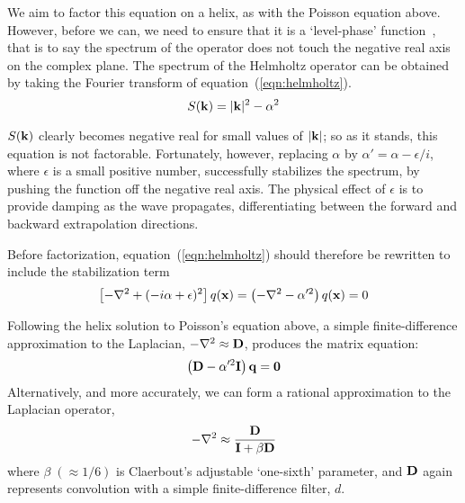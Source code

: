 \par
We aim to factor this equation on a helix, as with the Poisson
equation above.  However, before we can, we need to ensure
that it is a `level-phase' function~\cite{Claerbout.sep.97.jon1}, that
is to say the spectrum of the operator does not touch the negative
real axis on the complex plane.  
The spectrum of the Helmholtz operator can be obtained by taking the
Fourier transform of equation~(\ref{eqn:helmholtz}).
\begin{equation}
S({\bf k}) = |{\bf k}|^2 - \alpha^2 
\end{equation} 

\par
$S({\bf k})$ clearly becomes negative real for small
values of $| {\bf k} |$; so as it stands, this equation is not
factorable. Fortunately, however,  replacing $\alpha$ by $\alpha'=
\alpha-\epsilon / i$, where $\epsilon$ is a small positive number,
successfully stabilizes the spectrum, by pushing the function off the
negative real axis.  The physical effect of $\epsilon$ is to provide
damping as the wave propagates, differentiating between the forward
and backward extrapolation directions.

\par
Before factorization, equation~(\ref{eqn:helmholtz}) should therefore
be rewritten to include the stabilization term
\begin{equation} \label{eqn:singlefdamp}
\left[ -\nabla^2 + (-i \alpha + \epsilon)^2 \right] q({\bf x}) = 
\left( -\nabla^2 - \alpha'^2 \right) q({\bf x}) = 0
\end{equation} 

\par
Following the helix solution to Poisson's equation above, a simple 
finite-difference approximation to the Laplacian, $-\nabla^2 \approx
{\bf D}$, produces the matrix equation: 
\begin{equation}
\left( {\bf D} - \alpha'^2 {\bf I} \right) {\bf q} = {\bf 0}  
\end{equation}
Alternatively, and more accurately, we can form a rational
approximation to the Laplacian operator,
\begin{equation} \label{eqn:sixth}
-\nabla^2 \approx \frac{\bf D}{{\bf I} + \beta {\bf D}}
\end{equation}
where $\beta \; (\approx 1/6)$ is Claerbout's  adjustable
`one-sixth' parameter, and 
${\bf D}$ again represents convolution with a simple finite-difference
filter, $d$. 

